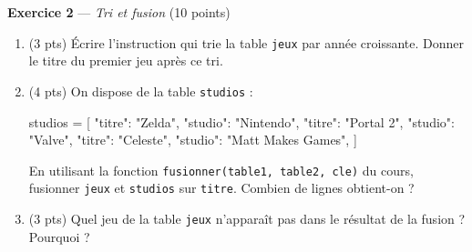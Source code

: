 \bigskip

\textbf{Exercice 2} --- \textit{Tri et fusion} \hfill (10 points)

\begin{enumerate}
  \item (3 pts) Écrire l'instruction qui trie la table \lstinline{jeux} par année croissante. Donner le titre du premier jeu après ce tri.
  \item (4 pts) On dispose de la table \lstinline{studios} :
\begin{python}
studios = [
    {"titre": "Zelda", "studio": "Nintendo"},
    {"titre": "Portal 2", "studio": "Valve"},
    {"titre": "Celeste", "studio": "Matt Makes Games"},
]
\end{python}
  En utilisant la fonction \lstinline{fusionner(table1, table2, cle)} du cours, fusionner \lstinline{jeux} et \lstinline{studios} sur \lstinline{titre}. Combien de lignes obtient-on ?
  \item (3 pts) Quel jeu de la table \lstinline{jeux} n'apparaît pas dans le résultat de la fusion ? Pourquoi ?
\end{enumerate}

